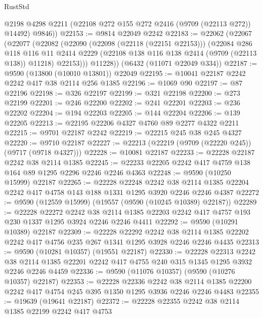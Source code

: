 \begin{lexlean}{RustStd}
\begin{coremodule}
        @2198
        @4298
        @2211
        (@22108 @272 @155 @272 @2416 (@9709 (@22113 @272)) @14492)
        @9846))
@22153 := @9814 @22049 @2242
@22183 := @22062
    (@22067
      (@22077
        (@22082
          (@22090
            (@22098 (@22118 (@22151 @22153)))
            (@22084
              @286
              @118
              @116
              @11
              @2414
              @2229
              (@22108 @138 @116 @138 @2414 (@9709 (@22113 @138)) @11218)
              @22153)))
        @11228))
    (@6432 (@11071 @22049 @334))
@22187 := @9590 (@13800 (@10010 @13801)) @22049
@22195 := @10041 @22187 @2242 @2242 @417 @38 @2114 @256 @1385
@22196 := @1069 @90
@22197 := @87 @22196
@22198 := @326 @22197
@22199 := @321 @22198
@22200 := @273 @22199
@22201 := @246 @22200
@22202 := @241 @22201
@22203 := @236 @22202
@22204 := @194 @22203
@22205 := @144 @22204
@22206 := @139 @22205
@22213 := @22195 @22206 @4327 @4760 @89 @2277 @4322 @2211
@22215 := @9701 @22187 @2242
@22219 := @22215 @245 @38 @245 @4327
@22220 := @9710 @22187
@22227 := @22213 (@22219 (@9709 (@22220 @245)) (@9717 (@9718 @4327)))
@22228 := @10081 @22187
@22233 := @22228 @22187 @2242 @38 @2114 @1385
@22245 := @22233 @22205 @2242 @417 @4759 @138 @164 @89 @1295 @2296 @2246 @2246 @4363
@22248 := @9590 (@10250 @15999) @22187
@22265 := @22228
    @22248
    @2242
    @38
    @2114
    @1385
    @22204
    @2242
    @417
    @4758
    @143
    @188
    @1331
    @1295
    @3920
    @2246
    @2246
    @4387
@22272 := @9590 (@12559 @15999) (@19557 (@9590 (@10245 @10389) @22187))
@22289 := @22228
    @22272
    @2242
    @38
    @2114
    @1385
    @22203
    @2242
    @417
    @4757
    @193
    @230
    @1337
    @1295
    @3924
    @2246
    @2246
    @4411
@22292 := @9590 (@10291 @10389) @22187
@22309 := @22228
    @22292
    @2242
    @38
    @2114
    @1385
    @22202
    @2242
    @417
    @4756
    @235
    @267
    @1341
    @1295
    @3928
    @2246
    @2246
    @4435
@22313 := @9590 (@10281 @10357) (@19551 @22187)
@22330 := @22228
    @22313
    @2242
    @38
    @2114
    @1385
    @22201
    @2242
    @417
    @4755
    @240
    @315
    @1345
    @1295
    @3932
    @2246
    @2246
    @4459
@22336 := @9590 (@11076 @10357) (@9590 (@10276 @10357) @22187)
@22353 := @22228
    @22336
    @2242
    @38
    @2114
    @1385
    @22200
    @2242
    @417
    @4754
    @245
    @395
    @1350
    @1295
    @3936
    @2246
    @2246
    @4483
@22355 := @19639 (@19641 @22187)
@22372 := @22228
    @22355
    @2242
    @38
    @2114
    @1385
    @22199
    @2242
    @417
    @4753

\end{coremodule}
\end{lexlean}
